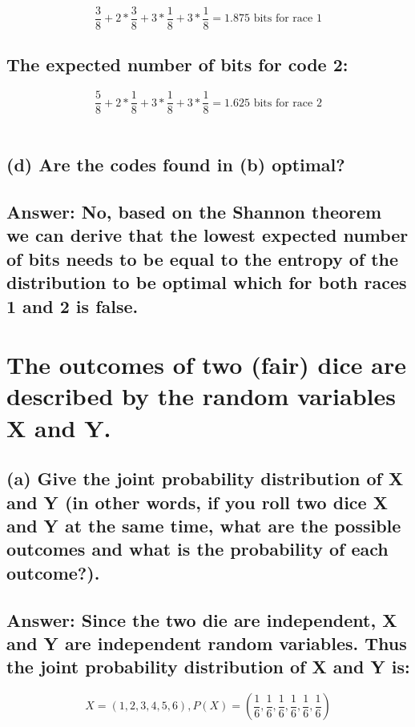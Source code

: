 \documentclass[15px]{article}
\begin{document}
\begin{equation}
\frac{3}{8} + 2*\frac{3}{8} + 3*\frac{1}{8} + 3*\frac{1}{8} = 1.875 \text{ bits for race 1} 
\end{equation}

\subsection*{ The expected number of bits for code 2:}

\begin{equation}
\frac{5}{8} + 2*\frac{1}{8} + 3*\frac{1}{8} + 3*\frac{1}{8} = 1.625 \text{ bits for race 2} 
\end{equation}\\

\subsection*{\normalfont(d) Are the codes found in (b) optimal?}

\subsection*{ Answer: No, based on the Shannon theorem we can derive that the lowest expected number of bits needs to be equal to the entropy of the distribution to be optimal which for both races 1 and 2 is false.}

\section{The outcomes of two (fair) dice are described by the random variables X and Y.}

\subsection*{\normalfont (a) Give the joint probability distribution of X and Y (in other words, if you roll two dice X and Y at the same time, what are the possible outcomes and what is the probability of each outcome?).}

\subsection*{ Answer: Since the two die are independent, X and Y are independent random variables. Thus the joint probability distribution of X and Y is:}

\begin{equation}
X = (1,2,3,4,5,6), P(X) = (\frac{1}{6},\frac{1}{6},\frac{1}{6},\frac{1}{6},\frac{1}{6},\frac{1}{6})
\end{equation}
\end{document}
